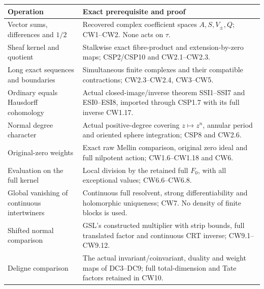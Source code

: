 {\def\LTcaptype{none} %
\begin{longtable}[]{@{}
  >{\raggedright\arraybackslash}p{}
  >{\raggedright\arraybackslash}p{}@{}}
\toprule\noalign{}
\begin{minipage}[b]{\linewidth}\raggedright
Operation
\end{minipage} & \begin{minipage}[b]{\linewidth}\raggedright
Exact prerequisite and proof
\end{minipage} \\
\midrule\noalign{}
\endhead
\bottomrule\noalign{}
\endlastfoot
Vector sums, differences and \(1/2\) & Recovered complex coefficient
spaces \(A,S,V_\pm,Q\); CW1--CW2. None acts on \(\tau\). \\
Sheaf kernel and quotient & Stalkwise exact fibre-product and
extension-by-zero maps; CSP2/CSP10 and CW2.1--CW2.3. \\
Long exact sequences and boundaries & Simultaneous finite complexes and
their compatible contractions; CW2.3--CW2.4, CW3--CW5. \\
Ordinary equals Hausdorff cohomology & Actual closed-image/inverse
theorem SSI1--SSI7 and ESI0--ESI8, imported through CSP1.7 with its full
inverse CW1.17. \\
Normal degree character & Actual positive-degree covering
\(z\mapsto z^n\), annular period and oriented sphere integration; CSP8
and CW2.6. \\
Original-zero weights & Exact raw Mellin comparison, original zero ideal
and full nilpotent action; CW1.6--CW1.18 and CW6. \\
Evaluation on the full kernel & Local division by the retained full
\(F_0\), with all exceptional values; CW6.6--CW6.8. \\
Global vanishing of continuous intertwiners & Continuous full resolvent,
strong differentiability and holomorphic uniqueness; CW7. No density of
finite blocks is used. \\
Shifted normal comparison & GSL's constructed multiplier with strip
bounds, full translated factor and continuous CRT inverse;
CW9.1--CW9.12. \\
Deligne comparison & The actual invariant/coinvariant, duality and
weight maps of DC3--DC9; full total-dimension and Tate factors retained
in CW10. \\
\end{longtable}
}

